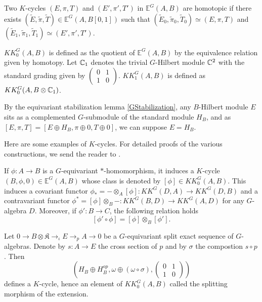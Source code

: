 \begin{definition}
Two $K$-cycles $(E,\pi,T)$ and $ (E',\pi',T')$ in $\mathbb E^G(A,B)$ are homotopic if there exists $ (\tilde E,\tilde \pi,\tilde T) \in\mathbb E^G(A,B[0,1])$ such that $(\tilde E_0,\tilde \pi_0,\tilde T_0)\simeq (E,\pi,T)$ and $(\tilde E_1,\tilde \pi_1,\tilde T_1)\simeq (E',\pi',T')$.
\end{definition}

\begin{definition} $KK_0^G(A,B)$ is defined as the quotient of $\mathbb E^G(A,B)$ by the equivalence relation given by homotopy. Let $\mathbb C_1$ denotes the trivial $G$-Hilbert module $\mathbb C^2$ with the standard grading given by $\begin{pmatrix}0 & 1 \\ 1 & 0 \end{pmatrix}$. $KK_1^G(A,B)$ is defined as $KK_0^G(A,B \otimes \mathbb C_1)$.
\end{definition}

\begin{rk}
By the equivariant stabilization lemma \ref{GStabilization}, any $B$-Hilbert module $E$ sits as a complemented $G$-submodule of the standard module $H_B$, and as $[E,\pi,T] = [E \oplus H_B,\pi\oplus 0,T\oplus 0]$, we can suppose $E = H_B$.
\end{rk}

Here are some examples of $K$-cycles. For detailed proofs of the various constructions, we send the reader to \cite{blackadar}.

\begin{Expl}
If $\phi : A\rightarrow B$ is a $G$-equivariant $*$-homomorphism, it induces a $K$-cycle $(B,\phi,0)\in \mathbb E^G(A,B)$ whose class is denoted by $[\phi]\in KK_0^G(A,B)$. This induces a covariant functor $\phi_* = - \otimes_A [\phi] : KK^G(D,A)\rightarrow KK^G(D,B)$ and a contravariant functor $\phi^*=  [\phi] \otimes_B - : KK^G(B,D)\rightarrow KK^G(A,D)$ for any $G$-algebra $D$. Moreover, if $\phi' : B\rightarrow C$, the following relation holds 
\[ [\phi'\circ \phi] = [\phi]\otimes_B [\phi'].\]
\end{Expl}

\begin{Expl} Let $0 \rightarrow B\otimes \mathfrak K \rightarrow_\iota E \rightarrow_p A \rightarrow 0 $ be a $G$-equivariant split exact sequence of $G$-algebras. Denote by $s : A \rightarrow E$ the cross section of $p$ and by $\sigma $ the compostion $s\circ p$. Then 
\[(H_B \oplus H_B^{op},\omega \oplus (\omega \circ \sigma ), \begin{pmatrix} 0 & 1 \\ 1 & 0\end{pmatrix} )\] 
defines a $K$-cycle, hence an element of $KK_0^G(A,B)$ called the splitting morphism of the extension. %
\end{Expl}

